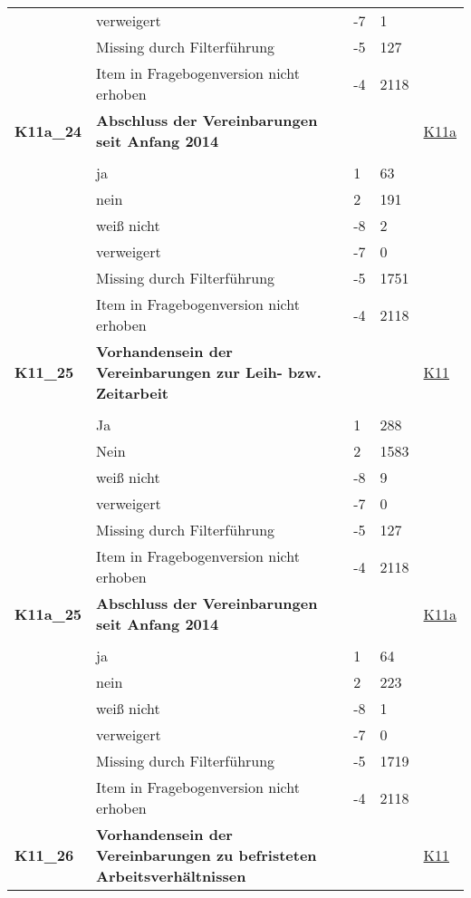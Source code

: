 \begin{longtable}{| L{2.5cm} | L{8.25cm}| C{1.5cm} | R{1.25cm} | C{2.25cm} |  }
   & verweigert & -7 & 1 &  \\ 
   & Missing durch Filterführung & -5 & 127 &  \\ 
   & Item in Fragebogenversion nicht erhoben & -4 & 2118 &  \\ 
   \midrule
\textbf{K11a\_24}\label{var:suf:K11a:24} & \textbf{Abschluss der Vereinbarungen seit Anfang 2014} &  &  & \hyperref[K11a]{K11a} \\ 
   &  &  &  &  \\ 
   & ja & 1 & 63 &  \\ 
   & nein & 2 & 191 &  \\ 
   & weiß nicht & -8 & 2 &  \\ 
   & verweigert & -7 & 0 &  \\ 
   & Missing durch Filterführung & -5 & 1751 &  \\ 
   & Item in Fragebogenversion nicht erhoben & -4 & 2118 &  \\ 
   \midrule
\textbf{K11\_25}\label{var:suf:K11:25} & \textbf{Vorhandensein der Vereinbarungen zur Leih- bzw. Zeitarbeit} &  &  & \hyperref[K11]{K11} \\ 
   &  &  &  &  \\ 
   & Ja & 1 & 288 &  \\ 
   & Nein & 2 & 1583 &  \\ 
   & weiß nicht & -8 & 9 &  \\ 
   & verweigert & -7 & 0 &  \\ 
   & Missing durch Filterführung & -5 & 127 &  \\ 
   & Item in Fragebogenversion nicht erhoben & -4 & 2118 &  \\ 
   \midrule
\textbf{K11a\_25}\label{var:suf:K11a:25} & \textbf{Abschluss der Vereinbarungen seit Anfang 2014} &  &  & \hyperref[K11a]{K11a} \\ 
   &  &  &  &  \\ 
   & ja & 1 & 64 &  \\ 
   & nein & 2 & 223 &  \\ 
   & weiß nicht & -8 & 1 &  \\ 
   & verweigert & -7 & 0 &  \\ 
   & Missing durch Filterführung & -5 & 1719 &  \\ 
   & Item in Fragebogenversion nicht erhoben & -4 & 2118 &  \\ 
   \midrule
\textbf{K11\_26}\label{var:suf:K11:26} & \textbf{Vorhandensein der Vereinbarungen zu befristeten Arbeitsverhältnissen} &  &  & \hyperref[K11]{K11} \\ 

\end{longtable}
